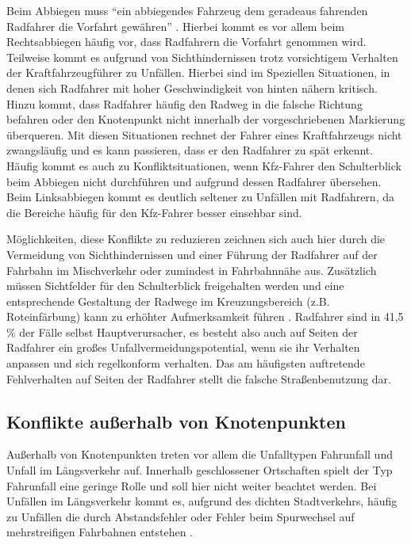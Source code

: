Beim Abbiegen muss \enquote{ein abbiegendes Fahrzeug dem geradeaus fahrenden Radfahrer die Vorfahrt gewähren} \parencite[S. 303]{Schreiber.2014b}. Hierbei kommt es vor allem beim Rechtsabbiegen häufig vor, dass Radfahrern die Vorfahrt genommen wird. Teilweise kommt es aufgrund von Sichthindernissen trotz vorsichtigem Verhalten der Kraftfahrzeugführer zu Unfällen. Hierbei sind im Speziellen Situationen, in denen sich Radfahrer mit hoher Geschwindigkeit von hinten nähern kritisch. Hinzu kommt, dass Radfahrer häufig den Radweg in die falsche Richtung befahren oder den Knotenpunkt nicht innerhalb der vorgeschriebenen Markierung überqueren. Mit diesen Situationen rechnet der Fahrer eines Kraftfahrzeugs nicht zwangsläufig und es kann passieren, dass er den Radfahrer zu spät erkennt. Häufig kommt es auch zu Konfliktsituationen, wenn Kfz-Fahrer den Schulterblick beim Abbiegen nicht durchführen und aufgrund dessen Radfahrer übersehen. Beim Linksabbiegen kommt es deutlich seltener zu Unfällen mit Radfahrern, da die Bereiche häufig für den Kfz-Fahrer besser einsehbar sind. %

Möglichkeiten, diese Konflikte zu reduzieren zeichnen sich auch hier durch die Vermeidung von Sichthindernissen und einer Führung der Radfahrer auf der Fahrbahn im Mischverkehr oder zumindest in Fahrbahnnähe aus. Zusätzlich müssen Sichtfelder für den Schulterblick freigehalten werden und eine entsprechende Gestaltung der Radwege im Kreuzungsbereich (z.B. Roteinfärbung) kann zu erhöhter Aufmerksamkeit führen \parencite[S. 309]{Schreiber.2014b}. Radfahrer sind in 41,5 \% \parencite[S. 10]{Below.2016} der Fälle selbst Hauptverursacher, es besteht also auch auf Seiten der Radfahrer ein großes Unfallvermeidungspotential, wenn sie ihr Verhalten anpassen und sich regelkonform verhalten. Das am häufigsten auftretende Fehlverhalten auf Seiten der Radfahrer stellt die falsche Straßenbenutzung dar.

\subsection{Konflikte außerhalb von Knotenpunkten}
Außerhalb von Knotenpunkten treten vor allem die Unfalltypen Fahrunfall und Unfall im Längsverkehr auf. Innerhalb geschlossener Ortschaften spielt der Typ Fahrunfall eine geringe Rolle und soll hier nicht weiter beachtet werden. Bei Unfällen im Längsverkehr kommt es, aufgrund des dichten Stadtverkehrs, häufig zu Unfällen die durch Abstandsfehler oder Fehler beim Spurwechsel auf mehrstreifigen Fahrbahnen entstehen \parencite[S. 25]{Schmidt.2010}.

